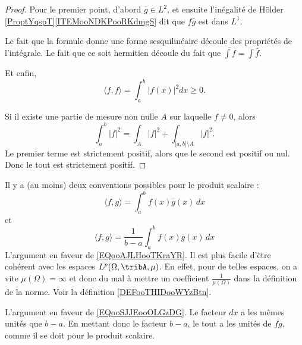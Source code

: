 \begin{proof}
	Pour le premier point, d'abord \( \bar g\in L^2\), et ensuite l'inégalité de Hölder \ref{ProptYqspT}\ref{ITEMooNDKPooRKdmgS} dit que \( f\bar g\) est dans \( L^1\).

	Le fait que la formule donne une forme sesquilinéaire découle des propriétés de l'intégrale. Le fait que ce soit hermitien découle du fait que \( \overline{ \int f }=\int\bar f\).

	Et enfin,
	\begin{equation}
		\langle f,f \rangle =\int_a^b| f(x) |^2dx\geq 0.
	\end{equation}

	Si il existe une partie de mesure non nulle \( A\) sur laquelle \( f\neq 0\), alors
	\begin{equation}
		\int_a^b| f |^2=\int_A| f |^2+\int_{\mathopen[ a , b \mathclose]\setminus A}| f |^2.
	\end{equation}
	Le premier terme est strictement positif, alors que le second est positif ou nul. Donc le tout est strictement positif.
\end{proof}

\begin{normaltext}
	Il y a (au moins) deux conventions possibles pour le produit scalaire :
	\begin{equation}    \label{EQooAJLHooTKraYR}
		\langle f, g\rangle =\int_a^bf(x)\bar g(x)\,dx
	\end{equation}
	et
	\begin{equation}    \label{EQooSJJEooOLGzDG}
		\langle f, g\rangle =\frac{1}{ b-a }\int_a^bf(x)\bar g(x)\,dx
	\end{equation}
	L'argument en faveur de \eqref{EQooAJLHooTKraYR}. Il est plus facile d'être cohérent avec les espaces \( L^p(\Omega, \tribA, \mu)\). En effet, pour de telles espaces, on a vite \( \mu(\Omega)=\infty\) et donc du mal à mettre un coefficient \( \frac{1}{ \mu(\Omega) }\) dans la définition de la norme. Voir la définition \ref{DEFooTHIDooWYzBtn}.

	L'argument en faveur de \eqref{EQooSJJEooOLGzDG}. Le facteur \( dx\) a les mêmes unités que \( b-a\). En mettant donc le facteur \( b-a\), le tout a les unités de \( fg\), comme il se doit pour le produit scalaire.
\end{normaltext}

